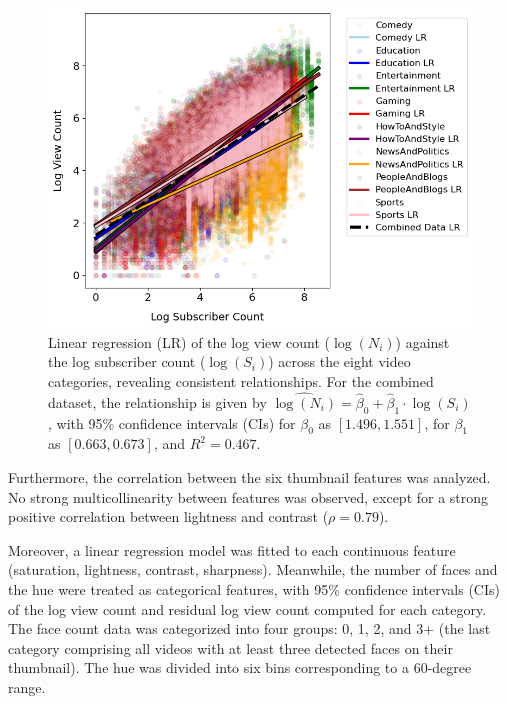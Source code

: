 \documentclass{article}
\begin{document}
\begin{figure}[h]
  \begin{minipage}[t]{0.67\textwidth}
    \vspace{0pt}  %
    \includegraphics[width=\textwidth]{figs/subscriber.png}
  \end{minipage}%
  \hspace{0.05\textwidth}%
  \begin{minipage}[t]{0.27\textwidth}
    \vspace{0pt}  %
    \caption{Linear regression (LR) of the log view count ($\log{(N_i)}$) against the log subscriber count ($\log{(S_i)}$) across the eight video categories, revealing consistent relationships. For the combined dataset, the relationship is given by $\widehat{\log(N_i)} = \hat{\beta}_0 + \hat{\beta}_1 \cdot \log(S_i)$, with 95\% confidence intervals (CIs) for $\beta_0$ as $[1.496, 1.551]$, for $\beta_1$ as $[0.663, 0.673]$, and $R^2 = 0.467$.}
    \label{fig:subscriber}
  \end{minipage}
\end{figure}

Furthermore, the correlation between the six thumbnail features was analyzed. No strong multicollinearity between features was observed, except for a strong positive correlation between lightness and contrast ($\rho=0.79$).

Moreover, a linear regression model was fitted to each continuous feature (saturation, lightness, contrast, sharpness). Meanwhile, the number of faces and the hue were treated as categorical features, with 95\% confidence intervals (CIs) of the log view count and residual log view count computed for each category. The face count data was categorized into four groups: 0, 1, 2, and 3+ (the last category comprising all videos with at least three detected faces on their thumbnail). The hue was divided into six bins corresponding to a 60-degree range.
\end{document}
